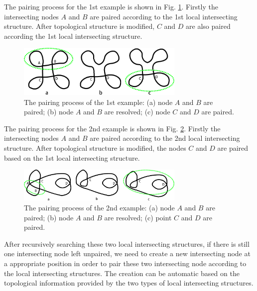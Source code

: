 \documentclass[final,5p,times,twocolumn]{elsarticle}
\begin{document}
The pairing process for the 1st example is shown in Fig. \ref{fig:pair_int_exam1_proc}. Firstly the intersecting nodes $A$ and $B$ are paired according to the 1st local intersecting structure. After topological structure is modified, $C$ and $D$ are also paired according the 1st local intersecting structure.

\begin{figure}[htbp]
\begin{center}
\includegraphics[width=8cm]{pmexam1step.png}
\caption{The pairing process of the 1st example: (a) node $A$ and $B$ are paired; (b) node $A$ and $B$ are resolved; (c) node $C$ and $D$ are paired.}
\label{fig:pair_int_exam1_proc}
\end{center}
\end{figure}

The pairing process for the 2nd example is shown in Fig. \ref{fig:pair_int_exam2_proc}. Firstly the intersecting nodes $A$ and $B$ are paired according to the 2nd local intersecting structure. After topological structure is modified, the nodes $C$ and $D$ are paired based on the 1st local intersecting structure.

\begin{figure}[htbp]
\begin{center}
\includegraphics[width=8cm]{pmexam2step.png}
\caption{The pairing process of the 2nd example: (a) node $A$ and $B$ are paired; (b) node $A$ and $B$ are resolved; (c) point $C$ and $D$ are paired.}
\label{fig:pair_int_exam2_proc}
\end{center}
\end{figure}

After recursively searching these two local intersecting structures, if there is still one intersecting node left unpaired, we need to create a new intersecting node at a appropriate position in order to pair these two intersecting node according to the local intersecting structures. The creation can be automatic based on the topological information provided by the two types of local intersecting structures.
\end{document}
